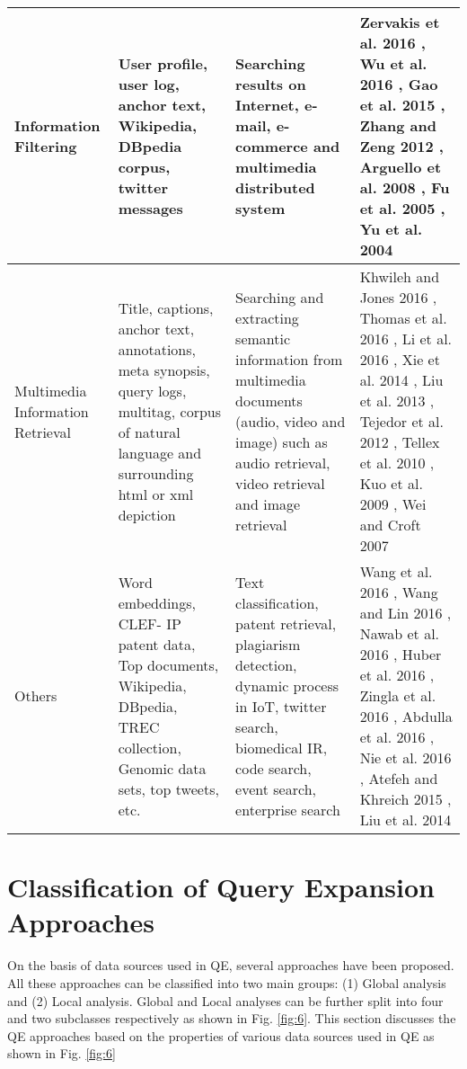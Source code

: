 \begin{table}[!h]
{\begin{tabular}{ | M{2.2cm} | M{3.4cm} | M{3.4cm} | M{3.5cm} | }
		Information Filtering & User profile, user log, anchor text, Wikipedia, DBpedia corpus, twitter messages  & Searching results on Internet, e-mail, e-commerce and multimedia distributed system & Zervakis et al. 2016 \cite{zervakis2017query}, Wu et al. 2016 \cite{wu2016cccf}, Gao et al. 2015 \cite{gao2015pattern}, Zhang and Zeng 2012 \cite{zhang2012behavior}, Arguello et al. 2008 \cite{arguello2008document}, Fu et al. 2005 \cite{fu2005ontology}, Yu et al. 2004 \cite{yu2004nonparametric}  \\ \hline
		Multimedia Information Retrieval & Title, captions, anchor text, annotations,  meta synopsis, query logs, multitag, corpus of natural language and surrounding html or xml depiction & Searching and extracting semantic information from multimedia documents (audio, video and image) such as audio retrieval, video retrieval and image retrieval & Khwileh and Jones 2016 \cite{khwileh2016investigating}, Thomas et al. 2016 \cite{thomas2016perceptual}, Li et al. 2016 \cite{li2016socializing}, Xie et al. 2014 \cite{xie2014contextual}, Liu et al. 2013 \cite{liu2013image}, Tejedor et al. 2012 \cite{tejedor2012comparison}, Tellex et al. 2010 \cite{tellex2010grounding}, Kuo et al. 2009 \cite{kuo2009query}, Wei and Croft 2007 \cite{wei2007modeling} \\ \hline
		Others & Word embeddings, CLEF- IP patent data, Top documents, Wikipedia, DBpedia, TREC collection, Genomic data sets, top tweets, etc. & Text classification, patent retrieval, plagiarism detection, dynamic process in IoT, twitter search, biomedical IR, code search, event search, enterprise search  & Wang et al. 2016 \cite{wang2016semantic}, Wang and Lin 2016 \cite{wang2016domain}, Nawab et al. 2016 \cite{nawab2016ir}, Huber et al.
		2016 \cite{huber2016goal}, Zingla et al. 2016 \cite{zingla2016short}, Abdulla et al. 2016 \cite{abdulla2016improving}, Nie et al. 2016 \cite{nie2016query}, Atefeh and Khreich 2015 \cite{atefeh2015survey}, Liu et al. 2014 \cite{liu2014exploiting} \\ \hline
	\end{tabular}}
\end{table}		


\section{Classification of Query Expansion Approaches}
\label{sec4}
On the basis of data sources used in QE, several approaches have been proposed. All these approaches can be classified into two main groups: (1) Global analysis and (2) Local analysis. Global and Local analyses can be further split into four and two subclasses respectively as shown in Fig. \ref{fig:6}. This section discusses the QE approaches based on the properties of various data sources used in QE as shown in  Fig. \ref{fig:6}


